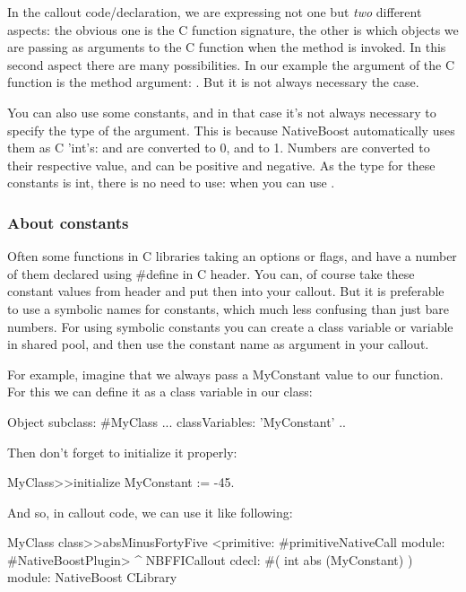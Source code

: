\documentclass[a4paper,10pt,twoside]{book}
\begin{document}
In the callout code/declaration, we are expressing not one but \emph{two} different aspects: the obvious one is the C function signature, the other
is which objects we are passing as arguments to the C function when the method is invoked. In this second aspect there are many possibilities. In our example the argument of the C function is the method argument: . But it is not always necessary the case.

You can also use some constants, and in that case it's not always necessary to specify the type of the argument. This is
because NativeBoost automatically uses them as C 'int's:  and  are converted to 0, and  to 1. Numbers are converted to their respective value, and can be positive and negative. As the type for these constants is int, there is no need to use:  when you can use . 


\subsubsection{About constants}
Often some functions in C libraries taking an options or flags, and
have a number of them declared using \#define in C header.
You can, of course take these constant values from header and put then
into your callout. But it is preferable to use a symbolic names for
constants, which much less confusing than just bare numbers.
For using symbolic constants you can create a class variable or
variable in shared pool, and then use the constant name as argument in
your callout.


For example, imagine that we always pass a MyConstant value to our
function. For this we can define it as a class variable in our class:

\begin{code}{}
Object subclass: #MyClass
	...
	classVariables: 'MyConstant'
..
\end{code}
Then don't forget to initialize it properly:

\begin{code}{}
MyClass>>initialize
	MyConstant := -45.
\end{code}

And so, in callout code, we can use it like following:

\begin{code}{}
MyClass class>>absMinusFortyFive
	<primitive: #primitiveNativeCall module: #NativeBoostPlugin>
	^ NBFFICallout cdecl: #( int abs (MyConstant) ) module: NativeBoost CLibrary
\end{code}
\end{document}
